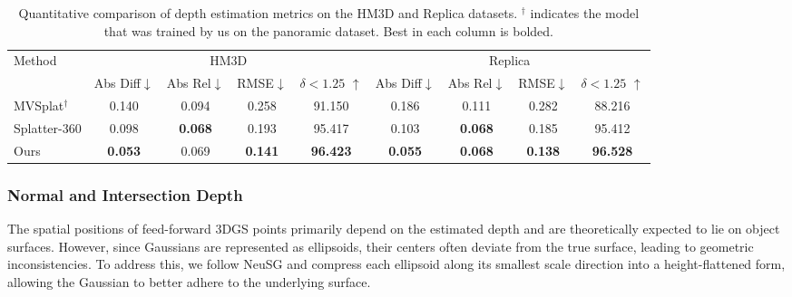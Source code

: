 \renewcommand{\arraystretch}{0.75} 
\begin{table}[htbp]
  \centering  \captionsetup{justification=raggedright,singlelinecheck=false}
  \scriptsize    
  \caption{Quantitative comparison of depth estimation metrics on the HM3D and Replica datasets. $^\dagger$ indicates the model that was trained by us on the panoramic dataset. Best in each column is bolded.}
  \label{tab:depth}
  \begin{tabular}{lcccccccc}
    \toprule
    \multirow{2}{*}{Method}  & \multicolumn{4}{c}{HM3D} & \multicolumn{4}{c}{Replica} \\
    \cmidrule(lr){2-5} \cmidrule(lr){5-9}
           & Abs Diff$\downarrow$ & Abs Rel$\downarrow$ & RMSE$\downarrow$ & $\delta < 1.25$ $\uparrow$
           & Abs Diff$\downarrow$ & Abs Rel$\downarrow$ & RMSE$\downarrow$ & $\delta < 1.25$ $\uparrow$ \\
    \midrule
    MVSplat$^\dagger$ & 0.140 & 0.094 & 0.258 & 91.150 & 0.186 & 0.111 & 0.282 & 88.216 \\
    Splatter-360  & 0.098 & \textbf{0.068} & 0.193 & 95.417 & 0.103 & \textbf{0.068} & 0.185 & 95.412\\
    Ours & \textbf{0.053} & 0.069 & \textbf{0.141} & \textbf{96.423} & \textbf{0.055} & \textbf{0.068} & \textbf{0.138} & \textbf{96.528} \\
    \bottomrule
  \end{tabular}
\end{table}

\subsubsection{Normal and Intersection Depth}\label{sec:Normal and Depth}
The spatial positions of feed-forward 3DGS points primarily depend on the estimated depth and are theoretically expected to lie on object surfaces. However, since Gaussians are represented as ellipsoids, their centers often deviate from the true surface, leading to geometric inconsistencies. To address this, we follow NeuSG and compress each ellipsoid along its smallest scale direction into a height-flattened form, allowing the Gaussian to better adhere to the underlying surface.

